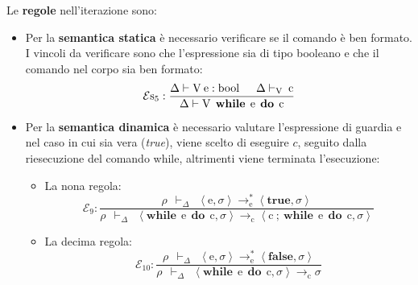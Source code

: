 \documentclass[a4paper]{article}
\begin{document}
 	\noindent
 	Le \textbf{regole} nell'iterazione sono:
 	\begin{itemize}
 		\item Per la \textbf{semantica statica} è necessario verificare se il comando è ben formato. I vincoli da verificare sono che l'espressione sia di tipo booleano e che il comando nel corpo sia ben formato:
 		\begin{equation*}
 			\mathcal{E}\mathrm{s}_{5} : \dfrac{
 				\Delta\vdash{\mathrm{V}} \: \mathrm{e:bool} \hspace{1.5em} \Delta\vdash_{\mathrm{V}} \: \mathrm{c}
 			}{
 				\Delta\vdash{\mathrm{V}} \:\: \mathbf{while} \:\: \mathrm{e} \:\: \mathbf{do} \:\: \mathrm{c}
 			}
 		\end{equation*}
 		
 		\item Per la \textbf{semantica dinamica} è necessario valutare l'espressione di guardia e nel caso in cui sia vera (\emph{true}), viene scelto di eseguire $c$, seguito dalla riesecuzione del comando \textsf{while}, altrimenti viene terminata l'esecuzione:
 		\begin{itemize}
 			\item La nona regola:
 			\begin{equation*}
 				\mathcal{E}_{9} : \dfrac{
 					\rho \:\: \vdash_{\Delta} \:\: \left\langle \mathrm{e}, \sigma \right\rangle \rightarrow_{\mathrm{e}}^{*} \left\langle \mathbf{true}, \sigma \right\rangle
 				}{
 					\rho \:\: \vdash_{\Delta} \:\: \left\langle \mathbf{while} \:\: \mathrm{e} \:\: \mathbf{do} \:\: \mathrm{c}, \sigma \right\rangle \rightarrow_{\mathrm{c}} \left\langle \mathrm{c} \: \boldsymbol{;} \: \mathbf{while} \:\: \mathrm{e} \:\: \mathbf{do} \:\: \mathrm{c}, \sigma \right\rangle
 				}
 			\end{equation*}
 			
 			\item La decima regola:
 			\begin{equation*}
 				\mathcal{E}_{10} : \dfrac{
 					\rho \:\: \vdash_{\Delta} \:\: \left\langle \mathrm{e}, \sigma \right\rangle \rightarrow_{\mathrm{e}}^{*} \left\langle \mathbf{false}, \sigma \right\rangle
 				}{
 					\rho \:\: \vdash_{\Delta} \:\: \left\langle \mathbf{while} \:\: \mathrm{e} \:\: \mathbf{do} \:\: \mathrm{c}, \sigma \right\rangle \rightarrow_{\mathrm{c}} \sigma
 				}
 			\end{equation*}
 		\end{itemize}
 	\end{itemize}\newpage
 	
\end{document}
